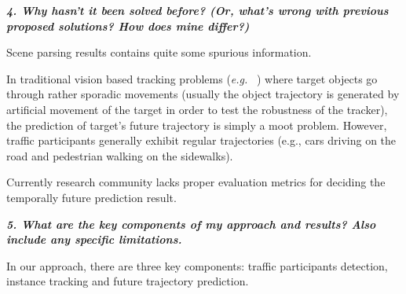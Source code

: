 \documentclass[10pt,twocolumn,letterpaper]{article}
\begin{document}
\textbf{\emph{4. Why hasn't it been solved before? (Or, what's wrong with previous proposed solutions? How does mine differ?)}}

Scene parsing results contains quite some spurious information.

In traditional vision based tracking problems (\emph{e.g.} ~\cite{wu2013online, wu2015object, mueller2016benchmark}) where target objects go through rather sporadic movements (usually the object trajectory is generated by artificial movement of the target in order to test the robustness of the tracker), the prediction of target's future trajectory is simply a moot problem.
However, traffic participants generally exhibit regular trajectories (e.g., cars driving on the road and pedestrian walking on the sidewalks).

Currently research community lacks proper evaluation metrics for deciding the temporally future prediction result.



\textbf{\emph{5. What are the key components of my approach and results? Also include any specific limitations.}}

In our approach, there are three key components: traffic participants detection, instance tracking and future trajectory prediction.

\end{document}
